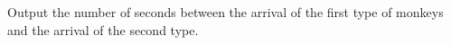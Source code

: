 Output the number of seconds between the arrival of the first type of monkeys and the arrival of the second type.
